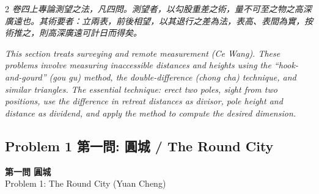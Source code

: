 \documentclass[11pt,a4paper]{article}
\newcommand{\probheader}[2]{%
  \begin{center}
  \colorbox{problembg}{\parbox{\dimexpr\linewidth-4pt}{%
    \centering\smallskip
    {\large\bfseries\color{sectioncolor}#1}\\[0.3em]
    {\normalsize\color{subsectioncolor}#2}%
    \smallskip
  }}
  \end{center}
  \vspace{0.5em}
}
\begin{document}
\begin{paracol}{2}
\switchcolumn[0]
\noindent\textit{\color{notecolor}卷四上專論測望之法，凡四問。測望者，以勾股重差之術，量不可至之物之高深廣遠也。其術要者：立兩表，前後相望，以其退行之差為法，表高、表間為實，按術推之，則高深廣遠可計日而得矣。}

\switchcolumn[1]
\noindent\textit{\color{notecolor}This section treats surveying and remote measurement (\textit{Ce Wang}). These problems involve measuring inaccessible distances and heights using the ``hook-and-gourd'' (\textit{gou gu}) method, the double-difference (\textit{chong cha}) technique, and similar triangles. The essential technique: erect two poles, sight from two positions, use the difference in retreat distances as divisor, pole height and distance as dividend, and apply the method to compute the desired dimension.}
\end{paracol}

\vspace{0.5em}

\subsection*{Problem 1 第一問: 圓城 / The Round City}

\probheader{第一問 圓城}{Problem 1: The Round City (Yuan Cheng)}
\end{document}
